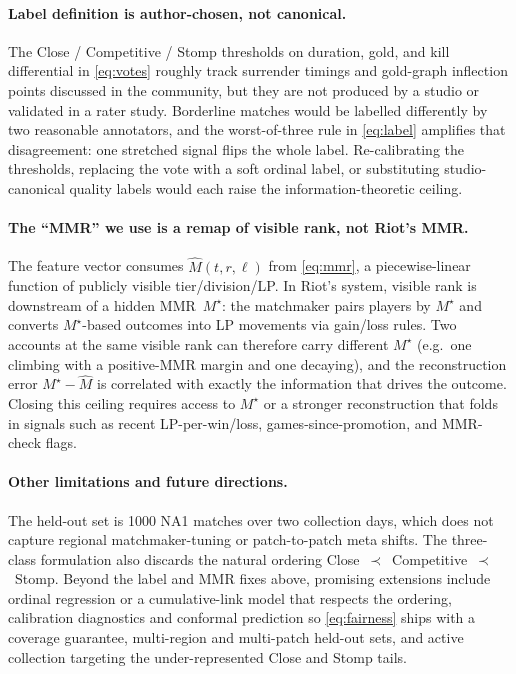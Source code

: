 \documentclass{article}
\begin{document}
\paragraph{Label definition is author-chosen, not canonical.}
The Close / Competitive / Stomp thresholds on duration, gold, and kill
differential in \eqref{eq:votes} roughly track surrender timings and
gold-graph inflection points discussed in the community, but they are not
produced by a studio or validated in a rater study. Borderline matches
would be labelled differently by two reasonable annotators, and the
worst-of-three rule in \eqref{eq:label} amplifies that disagreement: one
stretched signal flips the whole label. Re-calibrating the thresholds,
replacing the vote with a soft ordinal label, or substituting
studio-canonical quality labels would each raise the information-theoretic
ceiling.

\paragraph{The ``MMR'' we use is a remap of visible rank, not Riot's MMR.}
The feature vector consumes $\widehat{M}(t, r, \ell)$ from \eqref{eq:mmr},
a piecewise-linear function of publicly visible tier/division/LP. In
Riot's system, visible rank is downstream of a hidden MMR~$M^\star$: the
matchmaker pairs players by $M^\star$ and converts $M^\star$-based
outcomes into LP movements via gain/loss rules. Two accounts at the same
visible rank can therefore carry different $M^\star$ (e.g.\ one climbing
with a positive-MMR margin and one decaying), and the reconstruction
error $M^\star - \widehat{M}$ is correlated with exactly the information
that drives the outcome. Closing this ceiling requires access to
$M^\star$ or a stronger reconstruction that folds in signals such as
recent LP-per-win/loss, games-since-promotion, and MMR-check flags.

\paragraph{Other limitations and future directions.}
The held-out set is 1000 NA1 matches over two collection days, which does
not capture regional matchmaker-tuning or patch-to-patch meta shifts. The
three-class formulation also discards the natural ordering
Close~$\prec$~Competitive~$\prec$~Stomp. Beyond the label and MMR fixes
above, promising extensions include ordinal regression or a cumulative-link
model that respects the ordering, calibration diagnostics and conformal
prediction so \eqref{eq:fairness} ships with a coverage guarantee,
multi-region and multi-patch held-out sets, and active collection
targeting the under-represented Close and Stomp tails.
\end{document}
